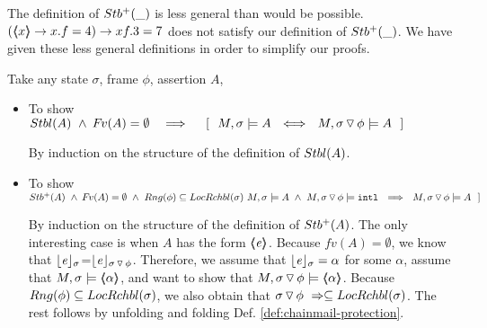 %

The definition  of ${Stb^+( \_ )}$ is  less  general than would be   possible. \Eg $(\langle\!\!\langle x \rangle\!\!\rangle \rightarrow  x.f=4) \rightarrow xf.3=7$  does not satisfy our definition of ${Stb^+( \_ )}$.
We have given these less general definitions in order to simplify our proofs.

Take any  state  $\sigma$, frame  $\phi$,  assertion  $A$,  
 
 
\begin{itemize}
\item 
To show\ \ \ \ \ \ \   ${Stbl( A )}\ \wedge \  {\hspace{-1pt}F\hspace{-1pt}}v(A)=\emptyset \ \ \  \Longrightarrow \ \  \ \  [\ \ M, \sigma \models A \ \ \Longleftrightarrow \ \  M,{ \sigma \, {\triangledown}\, \phi} \models A\ \ ]$

By induction on the structure of the definition of ${Stbl( A )}$.

\item 
To show\ \ \ \ \ \ \   $\Pos{A}\ \wedge \  \fv(A)=\emptyset \  \wedge \    Rng(\phi) \subseteq  \LRelevantO   \sigma   \ M, \sigma \models A \  \wedge \  M, {\PushSLong \phi \sigma} \models  \intThis \ \ \Longrightarrow \ \  M,{\PushSLong \phi \sigma} \models A\ \ ]$

By induction on the structure of the definition of ${Stb^+( A )}$.
The only interesting case is when $A$ has the form $\langle\!\!\langle \mathit{e} \rangle\!\!\rangle$. Because 
$ fv(A)=\emptyset$, we know that $\lfloor \mathit{e} \rfloor_{\sigma}$=$\lfloor \mathit{e} \rfloor_{ \sigma \, {\triangledown}\, \phi}$. Therefore, we assume that 
 $\lfloor \mathit{e} \rfloor_{\sigma} = \alpha$ for some $\alpha$, assume that $ M,  \sigma  \models \langle\!\!\langle \alpha \rangle\!\!\rangle$, and want to show that  $ M,{ \sigma \, {\triangledown}\, \phi} \models \langle\!\!\langle \alpha \rangle\!\!\rangle$. 
 Because  $Rng(\phi) \subseteq  LocRchbl(\sigma)$, we also obtain that
  $ { \sigma \, {\triangledown}\, \phi}\ \Rightarrow \subseteq LocRchbl(\sigma)$.
  The rest follows by unfolding and folding Def. \ref{def:chainmail-protection}.

  \end{itemize}
 
